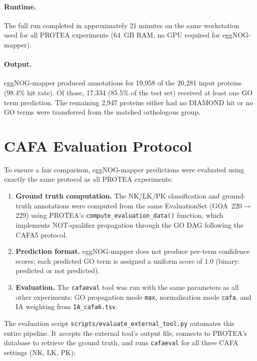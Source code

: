 \paragraph{Runtime.} The full run completed in approximately 21 minutes
on the same workstation used for all PROTEA experiments (64~GB RAM, no GPU
required for eggNOG-mapper).

\paragraph{Output.} eggNOG-mapper produced annotations for 19{,}958 of the
20{,}281 input proteins (98.4\% hit rate). Of those, 17{,}334 (85.5\% of the
test set) received at least one GO term prediction. The remaining 2{,}947
proteins either had no DIAMOND hit or no GO terms were transferred from the
matched orthologous group.

\section{CAFA Evaluation Protocol}
\label{app:ext-cafa-eval}

To ensure a fair comparison, eggNOG-mapper predictions were evaluated using
exactly the same protocol as all PROTEA experiments:

\begin{enumerate}
  \item \textbf{Ground truth computation.} The NK/LK/PK classification and
    ground-truth annotations were computed from the same EvaluationSet
    (GOA~220$\to$229) using PROTEA's \texttt{compute\_evaluation\_data()}
    function, which implements NOT-qualifier propagation through the GO DAG
    following the CAFA5 protocol.
  \item \textbf{Prediction format.} eggNOG-mapper does not produce per-term
    confidence scores; each predicted GO term is assigned a uniform score of
    1.0 (binary: predicted or not predicted).
  \item \textbf{Evaluation.} The \texttt{cafaeval} tool was run with the same
    parameters as all other experiments: GO propagation mode \texttt{max},
    normalisation mode \texttt{cafa}, and IA weighting from
    \texttt{IA\_cafa6.tsv}.
\end{enumerate}

The evaluation script \texttt{scripts/evaluate\_external\_tool.py} automates
this entire pipeline. It accepts the external tool's output file, connects
to PROTEA's database to retrieve the ground truth, and runs \texttt{cafaeval}
for all three CAFA settings (NK, LK, PK):

